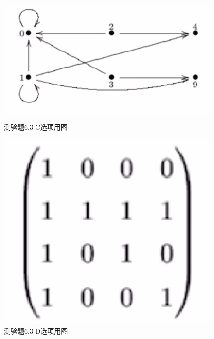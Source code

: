 \documentclass[UTF8, heading=true]{ctexart}
\begin{document}
\begin{figure}[H]
    \centering
    \begin{minipage}[t]{0.45\textwidth}
        \centering
        \includegraphics[width=1\textwidth]{6.3_1.jpg} %
	      \vspace{-0.3cm}
        \caption{测验题6.3 C选项用图}
    \end{minipage}
	  \hspace{0.1\textwidth} %
    \begin{minipage}[t]{0.23\textwidth}
        \centering
        \includegraphics[width=1\textwidth]{6.3_2.jpg} %
	      \vspace{-0.3cm}
        \caption{测验题6.3 D选项用图}
\end{minipage}
\end{figure}
\end{document}
